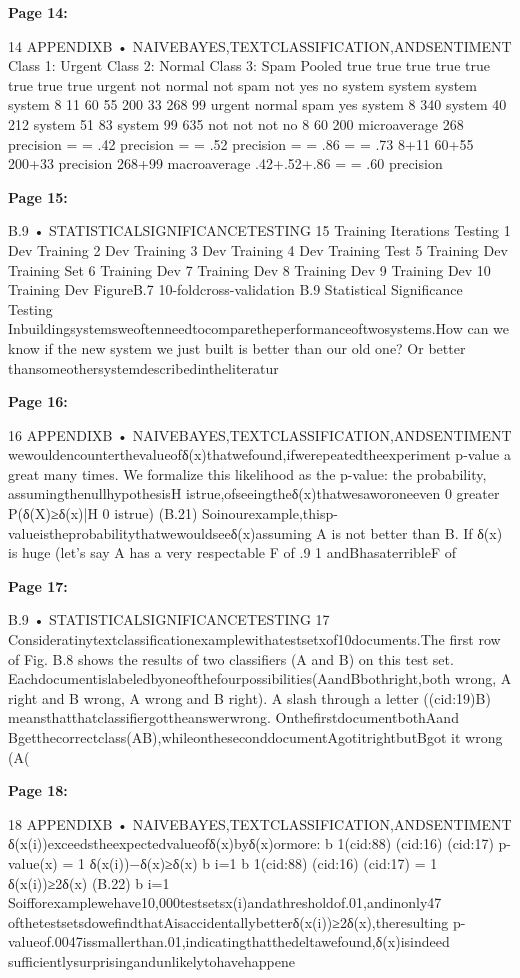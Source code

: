 \documentclass[11pt,a4paper]{article}
\begin{document}
\textbf{Page 14:}

14 APPENDIXB • NAIVEBAYES,TEXTCLASSIFICATION,ANDSENTIMENT
Class 1: Urgent Class 2: Normal Class 3: Spam Pooled
true true true true true true true true
urgent not normal not spam not yes no
system system system system
8 11 60 55 200 33 268 99
urgent normal spam yes
system 8 340 system 40 212 system 51 83 system 99 635
not not not no
8 60 200 microaverage 268
precision = = .42 precision = = .52 precision = = .86 = = .73
8+11 60+55 200+33 precision 268+99
macroaverage .42+.52+.86
= = .60
precision 

\textbf{Page 15:}

B.9 • STATISTICALSIGNIFICANCETESTING 15
Training Iterations Testing
1 Dev Training
2 Dev Training
3 Dev Training
4 Dev Training
Test
5 Training Dev Training
Set
6 Training Dev
7 Training Dev
8 Training Dev
9 Training Dev
10 Training Dev
FigureB.7 10-foldcross-validation
B.9 Statistical Significance Testing
Inbuildingsystemsweoftenneedtocomparetheperformanceoftwosystems.How
can we know if the new system we just built is better than our old one? Or better
thansomeothersystemdescribedintheliteratur

\textbf{Page 16:}

16 APPENDIXB • NAIVEBAYES,TEXTCLASSIFICATION,ANDSENTIMENT
wewouldencounterthevalueofδ(x)thatwefound,ifwerepeatedtheexperiment
p-value a great many times. We formalize this likelihood as the p-value: the probability,
assumingthenullhypothesisH istrue,ofseeingtheδ(x)thatwesaworoneeven
0
greater
P(δ(X)≥δ(x)|H 0 istrue) (B.21)
Soinourexample,thisp-valueistheprobabilitythatwewouldseeδ(x)assuming
A is not better than B. If δ(x) is huge (let’s say A has a very respectable F of .9
1
andBhasaterribleF of

\textbf{Page 17:}

B.9 • STATISTICALSIGNIFICANCETESTING 17
Consideratinytextclassificationexamplewithatestsetxof10documents.The
first row of Fig. B.8 shows the results of two classifiers (A and B) on this test set.
Eachdocumentislabeledbyoneofthefourpossibilities(AandBbothright,both
wrong, A right and B wrong, A wrong and B right). A slash through a letter ((cid:19)B)
meansthatthatclassifiergottheanswerwrong. OnthefirstdocumentbothAand
Bgetthecorrectclass(AB),whileontheseconddocumentAgotitrightbutBgot
it wrong (A(

\textbf{Page 18:}

18 APPENDIXB • NAIVEBAYES,TEXTCLASSIFICATION,ANDSENTIMENT
δ(x(i))exceedstheexpectedvalueofδ(x)byδ(x)ormore:
b
1(cid:88) (cid:16) (cid:17)
p-value(x) = 1 δ(x(i))−δ(x)≥δ(x)
b
i=1
b
1(cid:88) (cid:16) (cid:17)
= 1 δ(x(i))≥2δ(x) (B.22)
b
i=1
Soifforexamplewehave10,000testsetsx(i)andathresholdof.01,andinonly47
ofthetestsetsdowefindthatAisaccidentallybetterδ(x(i))≥2δ(x),theresulting
p-valueof.0047issmallerthan.01,indicatingthatthedeltawefound,δ(x)isindeed
sufficientlysurprisingandunlikelytohavehappene
\end{document}
